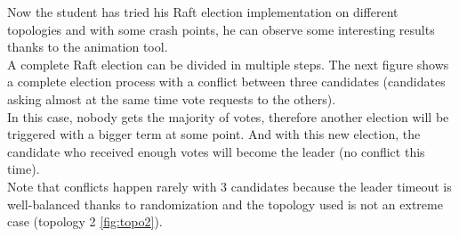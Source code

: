 \documentclass{eplmastersthesis}
\begin{document}
        Now the student has tried his Raft election implementation on
        different topologies and with some crash points, he can observe some
        interesting results thanks to the animation tool.\\
        A complete Raft election can be divided in multiple steps. The next
        figure shows a complete election process with a conflict between
        three candidates (candidates asking almost at the same time vote
        requests to the others).\\
        In this case, nobody gets the majority of votes, therefore another
        election will be triggered with a bigger term at some point.
        And with this new election, the candidate who received enough votes
        will become the leader (no conflict this time).\\
        Note that conflicts happen rarely with 3 candidates because the
        leader timeout is well-balanced thanks to randomization and the
        topology used is not an extreme case (topology 2 \ref{fig:topo2}).
\end{document}
